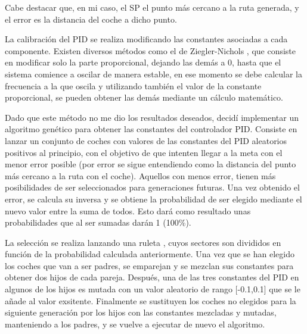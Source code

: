 \bigskip

Cabe destacar que, en mi caso, el SP el punto más cercano a la ruta generada, y el error es la distancia del coche a dicho punto.

\bigskip

La calibración del PID se realiza modificando las constantes asociadas a cada componente. Existen diversos métodos como el de Ziegler-Nichols \cite{enwiki:1140258750}, que consiste en modificar solo la parte proporcional, dejando las demás a 0, hasta que el sistema comience a oscilar de manera estable, en ese momento se debe calcular la frecuencia a la que oscila y utilizando también el valor de la constante proporcional, se pueden obtener las demás mediante un cálculo matemático.

\bigskip

Dado que este método no me dio los resultados deseados, decidí implementar un algoritmo genético para obtener las constantes del controlador PID. Consiste en lanzar un conjunto de coches con valores de las constantes del PID aleatorios positivos al principio, con el objetivo de que intenten llegar a la meta con el menor error posible (por error se sigue entendiendo como la distancia del punto más cercano a la ruta con el coche). Aquellos con menos error, tienen más posibilidades de ser seleccionados para generaciones futuras. Una vez obtenido el error, se calcula su inversa y se obtiene la probabilidad de ser elegido mediante el nuevo valor entre la suma de todos. Esto dará como resultado unas probabilidades que al ser sumadas darán 1 (100\%). 

\bigskip

La selección se realiza lanzando una ruleta \cite{enwiki:1141636554}, cuyos sectores son divididos en función de la probabilidad calculada anteriormente.
Una vez que se han elegido los coches que van a ser padres, se emparejan y se mezclan sus constantes para obtener dos hijos de cada pareja. Después, una de las tres constantes del PID en algunos de los hijos es mutada con un valor aleatorio de rango [-0.1,0.1] que se le añade al valor exsitente. Finalmente se sustituyen los coches no elegidos para la siguiente generación por los hijos con las constantes mezcladas y mutadas, manteniendo a los padres, y se vuelve a ejecutar de nuevo el algoritmo.

\bigskip

